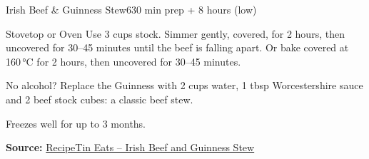 \begin{recipebox}{Irish Beef \& Guinness Stew}{6}{30 min prep + 8 hours (low)}
\begin{variationbox}{Stovetop or Oven}
Use 3 cups stock. Simmer gently, covered, for 2 hours, then uncovered for 30--45
minutes until the beef is falling apart. Or bake covered at 160\,°C for
2 hours, then uncovered for 30--45 minutes.
\end{variationbox}

\begin{notelist}
  \item No alcohol? Replace the Guinness with 2 cups water, 1 tbsp Worcestershire
        sauce and 2 beef stock cubes: a classic beef stew.
  \item Freezes well for up to 3 months.
\end{notelist}

\noindent\textbf{Source:} \href{https://www.recipetineats.com/irish-beef-and-guinness-stew/}{RecipeTin Eats -- Irish Beef and Guinness Stew}

\end{recipebox}
